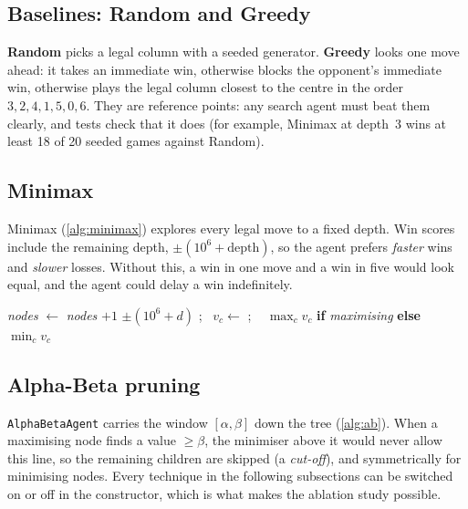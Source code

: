\documentclass[11pt,a4paper]{article}
\newcommand{\code}[1]{\texttt{\small #1}}
\begin{document}
\subsection{Baselines: Random and Greedy}
\textbf{Random} picks a legal column with a seeded generator. \textbf{Greedy} looks one move ahead: it takes an immediate win, otherwise blocks the opponent's immediate win, otherwise plays the legal column closest to the centre in the order $3,2,4,1,5,0,6$. They are reference points: any search agent must beat them clearly, and tests check that it does (for example, Minimax at depth~3 wins at least 18 of 20 seeded games against Random).

\subsection{Minimax}
Minimax (\cref{alg:minimax}) explores every legal move to a fixed depth. Win scores include the remaining depth, $\pm(10^6 + \text{depth})$, so the agent prefers \emph{faster} wins and \emph{slower} losses. Without this, a win in one move and a win in five would look equal, and the agent could delay a win indefinitely.

\begin{algorithm}[ht]
\caption{Depth-limited Minimax (\code{agents/minimax.py})}\label{alg:minimax}
\begin{algorithmic}[1]
  \State \textit{nodes} $\gets$ \textit{nodes} $+1$
   \Return $\pm(10^6 + d)$ 
  \EndIf
    \EndIf
   \Return {} \EndIf
     \State {}; \ $v_c \gets$ ; \ 
  \EndFor
  \State \Return $\max_c v_c$ \textbf{if} \textit{maximising} \textbf{else} $\min_c v_c$
\EndFunction
\end{algorithmic}
\end{algorithm}

\subsection{Alpha-Beta pruning}
\code{AlphaBetaAgent} carries the window $[\alpha,\beta]$ down the tree (\cref{alg:ab}). When a maximising node finds a value $\ge\beta$, the minimiser above it would never allow this line, so the remaining children are skipped (a \emph{cut-off}), and symmetrically for minimising nodes. Every technique in the following subsections can be switched on or off in the constructor, which is what makes the ablation study possible.
\end{document}
